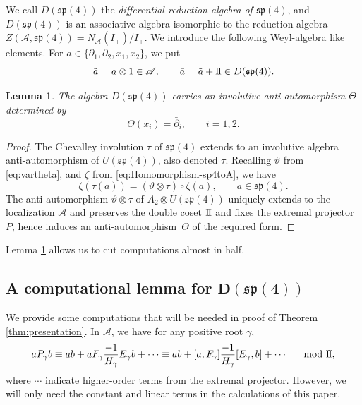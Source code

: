 \documentclass[pdftex]{sigma}
\numberwithin{equation}{section}
\newtheorem{Lemma}[Theorem]{Lemma}
\newcommand{\II}{\mathrm{I\hspace{-.1em}I}}
\begin{document}
We call $D(\mathfrak{sp}(4))$ the \emph{differential reduction algebra of $\mathfrak{sp}(4)$}, and $D(\mathfrak{sp}(4))$ is an associative algebra isomorphic to the
reduction algebra $Z(\mathscr{A},\mathfrak{sp}(4))=N_{\mathscr{A}}(I_+)/I_+$.
We introduce the following Weyl-algebra like elements.
For $a\in\{\partial_1,\partial_2,x_1,x_2\}$, we put
\[%
	\tilde a=a\otimes 1\in \mathscr{A}, \qquad \bar a=\tilde a+ \II \in D(\mathfrak{sp}(4)).
\]

\begin{Lemma}\label{lem:Dsp4-anti-automorphism}
	The algebra $D(\mathfrak{sp}(4))$ carries an involutive anti-automorphism $\Theta$ determined by
	\[
		\Theta(\bar x_i) = \bar \partial_i,\qquad i=1,2.
	\]
\end{Lemma}

\begin{proof}
	The Chevalley involution $\tau$ of $\mathfrak{sp}(4)$ extends to an involutive algebra anti-automorphism of $U(\mathfrak{sp}(4))$, also denoted $\tau$. Recalling $\vartheta$ from \eqref{eq:vartheta}, and $\zeta$ from \eqref{eq:Homomorphism-sp4toA},
	we have
	\[
		\zeta(\tau(a)) = (\vartheta\otimes \tau)\circ \zeta(a),\qquad a\in\mathfrak{sp}(4).
	\]
	The anti-automorphism $\vartheta\otimes\tau$ of $A_2\otimes U(\mathfrak{sp}(4))$ uniquely extends to the localization $\mathscr{A}$ and preserves the double coset $\II$ and fixes the extremal projector $P$, hence induces an anti-automor\-phism~$\Theta$ of the required form.
\end{proof}

Lemma \ref{lem:Dsp4-anti-automorphism} allows us to cut computations almost in half.

\subsection[A computational lemma for D(sp(4))]{A computational lemma for $\boldsymbol{D(\mathfrak{sp}(4))}$}\label{subsec:ComputationalLemma}
We provide some computations that will be needed in proof of Theorem \ref{thm:presentation}.
In $\mathscr{A}$, we have for any positive root $\gamma$,
\begin{gather}\label{eq:P_gamma}
	aP_\gamma b \equiv
	ab+aF_\gamma\frac{-1}{H_\gamma}E_{\gamma}b + \cdots
	\equiv ab+[a,F_\gamma]\frac{-1}{H_\gamma}[E_{\gamma},b] + \cdots\quad \mod{\II},
\end{gather}
where $\cdots$ indicate higher-order terms from the extremal projector. However, we will only need the constant and linear terms in the calculations of this paper.
\end{document}
